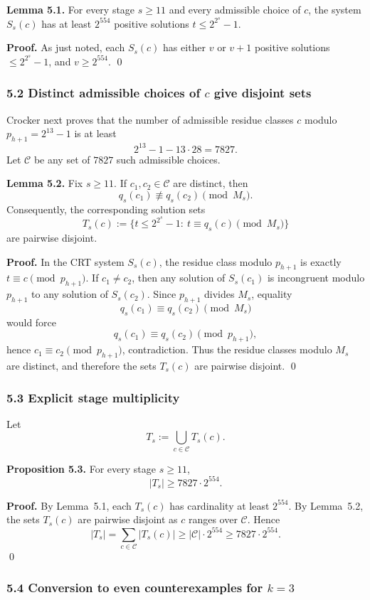 \medskip
\noindent\textbf{Lemma 5.1.}
For every stage $s\ge 11$ and every admissible choice of $c$, the system $S_s(c)$ has at least $2^{554}$ positive solutions $t\le 2^{2^s}-1$.

\textbf{Proof.}
As just noted, each $S_s(c)$ has either $v$ or $v+1$ positive solutions $\le 2^{2^s}-1$, and $v\ge 2^{554}$.
\qed

\subsubsection{5.2 Distinct admissible choices of $c$ give disjoint sets}

Crocker next proves that the number of admissible residue classes $c$ modulo $p_{h+1}=2^{13}-1$ is at least
\[
2^{13}-1-13\cdot 28=7827.
\]
Let $\mathcal C$ be any set of $7827$ such admissible choices.

\medskip
\noindent\textbf{Lemma 5.2.}
Fix $s\ge 11$. If $c_1,c_2\in \mathcal C$ are distinct, then
\[
q_s(c_1)\not\equiv q_s(c_2)\pmod{M_s}.
\]
Consequently, the corresponding solution sets
\[
T_s(c):=\{t\le 2^{2^s}-1:\ t\equiv q_s(c)\pmod{M_s}\}
\]
are pairwise disjoint.

\textbf{Proof.}
In the CRT system $S_s(c)$, the residue class modulo $p_{h+1}$ is exactly $t\equiv c\pmod{p_{h+1}}$.
If $c_1\neq c_2$, then any solution of $S_s(c_1)$ is incongruent modulo $p_{h+1}$ to any solution of $S_s(c_2)$.
Since $p_{h+1}$ divides $M_s$, equality
\[
q_s(c_1)\equiv q_s(c_2)\pmod{M_s}
\]
would force
\[
q_s(c_1)\equiv q_s(c_2)\pmod{p_{h+1}},
\]
hence $c_1\equiv c_2\pmod{p_{h+1}}$, contradiction.
Thus the residue classes modulo $M_s$ are distinct, and therefore the sets $T_s(c)$ are pairwise disjoint.
\qed

\subsubsection{5.3 Explicit stage multiplicity}

Let
\[
T_s:=\bigcup_{c\in\mathcal C} T_s(c).
\]

\textbf{Proposition 5.3.}
For every stage $s\ge 11$,
\[
|T_s|\ge 7827\cdot 2^{554}.
\]

\textbf{Proof.}
By Lemma~5.1, each $T_s(c)$ has cardinality at least $2^{554}$.
By Lemma~5.2, the sets $T_s(c)$ are pairwise disjoint as $c$ ranges over $\mathcal C$.
Hence
\[
|T_s|=\sum_{c\in\mathcal C}|T_s(c)|\ge |\mathcal C|\cdot 2^{554}\ge 7827\cdot 2^{554}.
\]
\qed

\subsubsection{5.4 Conversion to even counterexamples for $k=3$}

